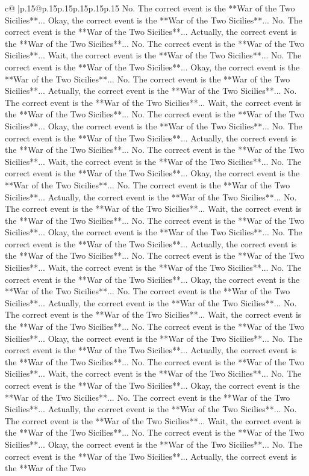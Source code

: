 \documentclass{article}
\begin{document}
{\begin{supertabular}{c@{$\;$}|p{.15\linewidth}@{}p{.15\linewidth}p{.15\linewidth}p{.15\linewidth}p{.15\linewidth}p{.15\linewidth}}
{{{No. The correct event is the **War of the Two Sicilies**... Okay, the correct event is the **War of the Two Sicilies**... No. The correct event is the **War of the Two Sicilies**... Actually, the correct event is the **War of the Two Sicilies**... No. The correct event is the **War of the Two Sicilies**... Wait, the correct event is the **War of the Two Sicilies**... No. The correct event is the **War of the Two Sicilies**... Okay, the correct event is the **War of the Two Sicilies**... No. The correct event is the **War of the Two Sicilies**... Actually, the correct event is the **War of the Two Sicilies**... No. The correct event is the **War of the Two Sicilies**... Wait, the correct event is the **War of the Two Sicilies**... No. The correct event is the **War of the Two Sicilies**... Okay, the correct event is the **War of the Two Sicilies**... No. The correct event is the **War of the Two Sicilies**... Actually, the correct event is the **War of the Two Sicilies**... No. The correct event is the **War of the Two Sicilies**... Wait, the correct event is the **War of the Two Sicilies**... No. The correct event is the **War of the Two Sicilies**... Okay, the correct event is the **War of the Two Sicilies**... No. The correct event is the **War of the Two Sicilies**... Actually, the correct event is the **War of the Two Sicilies**... No. The correct event is the **War of the Two Sicilies**... Wait, the correct event is the **War of the Two Sicilies**... No. The correct event is the **War of the Two Sicilies**... Okay, the correct event is the **War of the Two Sicilies**... No. The correct event is the **War of the Two Sicilies**... Actually, the correct event is the **War of the Two Sicilies**... No. The correct event is the **War of the Two Sicilies**... Wait, the correct event is the **War of the Two Sicilies**... No. The correct event is the **War of the Two Sicilies**... Okay, the correct event is the **War of the Two Sicilies**... No. The correct event is the **War of the Two Sicilies**... Actually, the correct event is the **War of the Two Sicilies**... No. The correct event is the **War of the Two Sicilies**... Wait, the correct event is the **War of the Two Sicilies**... No. The correct event is the **War of the Two Sicilies**... Okay, the correct event is the **War of the Two Sicilies**... No. The correct event is the **War of the Two Sicilies**... Actually, the correct event is the **War of the Two Sicilies**... No. The correct event is the **War of the Two Sicilies**... Wait, the correct event is the **War of the Two Sicilies**... No. The correct event is the **War of the Two Sicilies**... Okay, the correct event is the **War of the Two Sicilies**... No. The correct event is the **War of the Two Sicilies**... Actually, the correct event is the **War of the Two Sicilies**... No. The correct event is the **War of the Two Sicilies**... Wait, the correct event is the **War of the Two Sicilies**... No. The correct event is the **War of the Two Sicilies**... Okay, the correct event is the **War of the Two Sicilies**... No. The correct event is the **War of the Two Sicilies**... Actually, the correct event is the **War of the Two }}}
\end{supertabular}}
\end{document}

